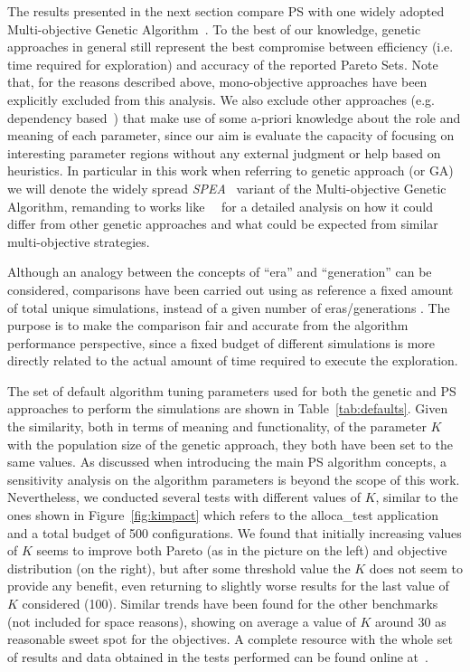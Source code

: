 The results presented in the next section compare PS with one widely
adopted Multi-objective Genetic Algorithm~\cite{knowles_techrep06}. To
the best of our knowledge, genetic approaches in general still
represent the best compromise between efficiency (i.e. time required
for exploration) and accuracy of the reported Pareto Sets.  Note that,
for the reasons described above, mono-objective approaches have been
explicitly excluded from this analysis.  We also exclude other
approaches (e.g.  dependency based~\cite{givargis_tvlsi02}) that make
use of some a-priori knowledge about the role and meaning of each
parameter, since our aim is evaluate the capacity of focusing on
interesting parameter regions without any external judgment or help
based on heuristics.  In particular in this work when referring to
genetic approach (or GA) we will denote the widely spread 
\emph{SPEA}~\cite{zitzler_eurogen01} variant of the Multi-objective
Genetic Algorithm, remanding to
works like~\cite{zitzler_ec00}~\cite{zitzler_tec03} for a detailed
analysis on how it could differ from other genetic approaches and what
could be expected from similar multi-objective strategies. 

Although an analogy between the concepts of ``era'' and ``generation''
can be considered, comparisons have been carried out using as
reference a fixed amount of total unique simulations, instead of a given
number of eras/generations . The purpose is to make the comparison
fair and accurate from the algorithm performance perspective, since a fixed budget of
different simulations is more directly related to the actual amount of time
required to execute the exploration.

The set of default algorithm tuning parameters used for both the
genetic and PS approaches to perform the simulations are shown in
Table~\ref{tab:defaults}. Given the similarity, both in terms of
meaning and functionality, of the parameter $K$ with the population size
of the genetic approach, they both have been set to the same values. As discussed
when introducing the main PS algorithm concepts, a sensitivity analysis on the algorithm parameters is beyond the scope of this work. Nevertheless, we conducted several tests with
different values of $K$, similar to the ones shown in
Figure~\ref{fig:kimpact} which refers to the alloca\_test application
and a total budget of 500 configurations. We found that initially increasing values
of $K$ seems to improve both Pareto (as in the picture on the left) and objective
distribution (on the right), but after some threshold value the $K$ does
not seem to provide any benefit, even returning to slightly worse
results for the last value of $K$ considered (100). Similar trends have been
found for the other benchmarks (not included for space reasons),
showing on average a value of $K$ around 30 as
reasonable sweet spot for the objectives. A complete resource with the
whole set of results and data obtained in the tests performed can be found online
at~\cite{ps_results}.

